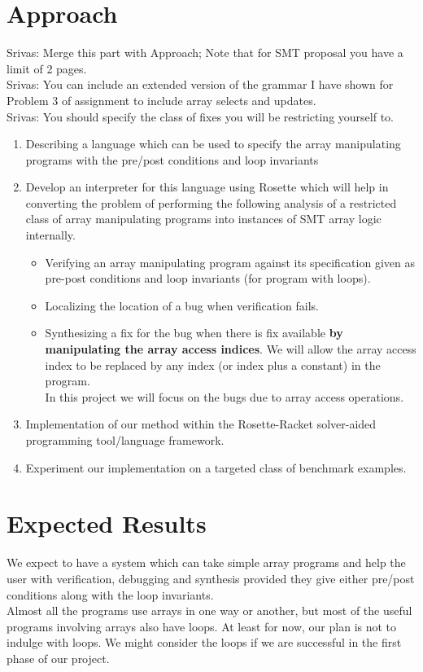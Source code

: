 \documentclass[a4paper, 12pt, notitlepage] {article}
\newcommand{\mscmt}[1]{{\color{blue} \tiny{Srivas: {#1}}}}
\begin{document}
\section {Approach}

\mscmt{Merge this part with Approach; Note that for SMT proposal you have a limit of 2 pages.} \\
\mscmt{You can include an extended version of the grammar I have shown for Problem 3 of assignment to include array selects and updates.} \\
\mscmt{You should specify the class of fixes you will be restricting yourself to.} \\

\begin{enumerate}
	\item  Describing a language which can be used to specify the array manipulating programs with the pre/post conditions and loop invariants \\
	\item Develop an interpreter for this language using Rosette which will help in converting the problem of performing the following analysis of a restricted class of array manipulating programs into instances of SMT array logic internally.
	\begin{itemize}
		\item Verifying an array manipulating program against its specification given as pre-post conditions and loop invariants (for program with loops).
		\item Localizing the location of a bug when verification fails.
		\item Synthesizing a fix for the bug when there is fix available {\bf by manipulating the array access indices}. We will allow the array access index to be replaced by any index (or index plus a constant) in the program. \\
		In this project we will focus on the bugs due to array access operations.
	\end{itemize}
	
	\item Implementation of our method within the Rosette-Racket solver-aided programming tool/language framework.\
	
	\item Experiment our implementation on a targeted class of benchmark examples.
\end{enumerate}


\section{Expected Results}
We expect to have a system which can take simple array programs and help the user with verification, debugging and synthesis provided they give either pre/post conditions along with the loop invariants.
\\
Almost all the programs use arrays in one way or another, but most of the useful programs involving arrays also have loops. At least for now, our plan is not to indulge with loops. We might consider the loops if we are successful in the first phase of our project. 
\end{document}
